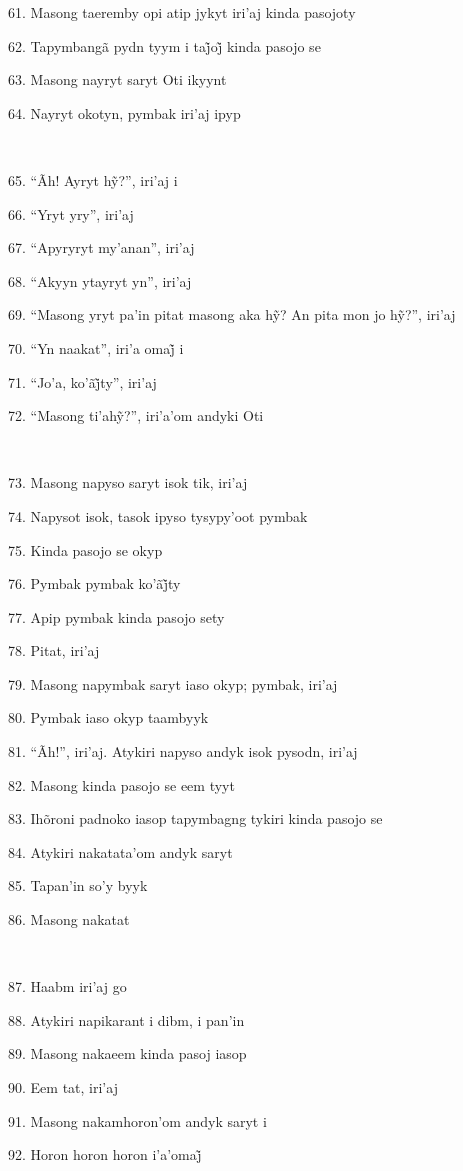 61. Masong taeremby opi atip jykyt iri'aj kinda pasojoty

62. Tapymbangã pydn tyym i taj̃oj̃ kinda pasojo se

63. Masong nayryt saryt Oti ikyynt

64. Nayryt okotyn, pymbak iri'aj ipyp

~

65. ``Ãh! Ayryt hỹ?'', iri’aj i

66. ``Yryt yry'', iri'aj

67. ``Apyryryt my'anan'', iri'aj

68. ``Akyyn ytayryt yn'', iri'aj

69. ``Masong yryt pa’in pitat masong aka hỹ? An pita mon jo hỹ?'', iri’aj

70. ``Yn naakat'', iri’a omaj̃ i

71. ``Jo’a, ko’ãj̃ty'', iri’aj

72. ``Masong ti’ahỹ?'', iri’a’om andyki Oti

~

73. Masong napyso saryt isok tik, iri'aj

74. Napysot isok, tasok ipyso tysypy'oot pymbak

75. Kinda pasojo se okyp

76. Pymbak pymbak ko’ãj̃ty

77. Apip pymbak kinda pasojo sety

78. Pitat, iri'aj

79. Masong napymbak saryt iaso okyp; pymbak, iri'aj

80. Pymbak iaso okyp taambyyk

81. ``Ãh!'', iri'aj. Atykiri napyso andyk isok pysodn, iri'aj

82. Masong kinda pasojo se eem tyyt

83. Ihõroni padnoko iasop tapymbagng tykiri kinda pasojo se

84. Atykiri nakatata'om andyk saryt

85. Tapan'in so'y byyk

86. Masong nakatat

~

87. Haabm iri'aj go

88. Atykiri napikarant i dibm, i pan'in

89. Masong nakaeem kinda pasoj iasop

90. Eem tat, iri'aj

91. Masong nakamhoron'om andyk saryt i

92. Horon horon horon i’a’omaj̃

